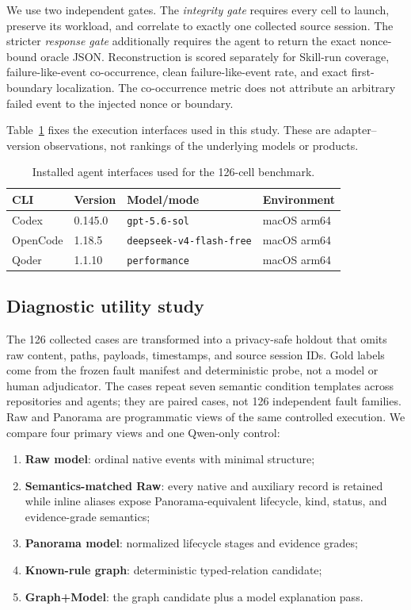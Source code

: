 \documentclass[runningheads]{llncs}
\begin{document}
We use two independent gates.  The \emph{integrity gate} requires every cell to
launch, preserve its workload, and correlate to exactly one collected source
session.  The stricter \emph{response gate} additionally requires the agent to
return the exact nonce-bound oracle JSON.  Reconstruction is scored separately
for Skill-run coverage, failure-like-event co-occurrence, clean
failure-like-event rate, and exact first-boundary localization.  The
co-occurrence metric does not attribute an arbitrary failed event to the
injected nonce or boundary.

Table~\ref{tab:agents} fixes the execution interfaces used in this study.  These
are adapter--version observations, not rankings of the underlying models or
products.

\begin{table}[t]
\centering
\caption{Installed agent interfaces used for the 126-cell benchmark.}
\label{tab:agents}
\small
\begin{tabular}{@{}llll@{}}
\toprule
CLI & Version & Model/mode & Environment \\
\midrule
Codex & 0.145.0 & \texttt{gpt-5.6-sol} & macOS arm64 \\
OpenCode & 1.18.5 & \texttt{deepseek-v4-flash-free} & macOS arm64 \\
Qoder & 1.1.10 & \texttt{performance} & macOS arm64 \\
\bottomrule
\end{tabular}
\end{table}

\subsection{Diagnostic utility study}

The 126 collected cases are transformed into a privacy-safe holdout that omits
raw content, paths, payloads, timestamps, and source session IDs.  Gold labels
come from the frozen fault manifest and deterministic probe, not a model or
human adjudicator.  The cases repeat seven semantic condition templates across
repositories and agents; they are paired cases, not 126 independent fault
families.  Raw and Panorama are programmatic views of the same controlled
execution.  We compare four primary views and one Qwen-only control:

\begin{enumerate}
  \item \textbf{Raw model}: ordinal native events with minimal structure;
  \item \textbf{Semantics-matched Raw}: every native and auxiliary record is
  retained while inline aliases expose Panorama-equivalent lifecycle, kind,
  status, and evidence-grade semantics;
  \item \textbf{Panorama model}: normalized lifecycle stages and evidence grades;
  \item \textbf{Known-rule graph}: deterministic typed-relation candidate;
  \item \textbf{Graph+Model}: the graph candidate plus a model explanation pass.
\end{enumerate}
\end{document}

